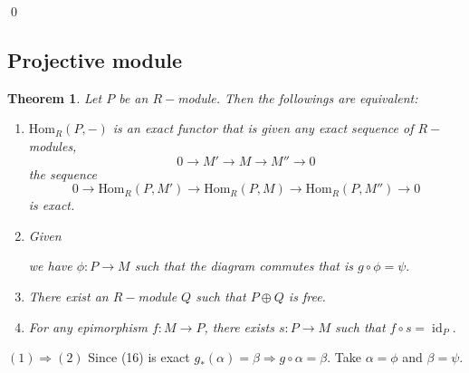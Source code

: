 \documentclass[11pt]{amsart}
\newtheorem{theorem}{Theorem}[section]
\newcommand{\Hom}[1]{\text{Hom}_R\left(#1\right)}
\DeclareMathOperator{\id}{\text{id}}
\begin{document}
\proof 

\qed

\subsection{Projective module}

\begin{theorem}

Let $P$ be an $R-$module. Then the followings are equivalent:

\begin{enumerate}

\item $\Hom{P,-}$ is an exact functor that is given any exact sequence of $R-$modules, $$0\to M'\to M\to M''\to 0$$ the sequence \begin{equation}
0\to \Hom{P,M'}\to \Hom{P,M}\to \Hom{P,M''}\to 0
\end{equation} is exact.

\item  Given \begin{center}


\end{center}
we have $\phi:P\to M$ such that the diagram commutes that is $g\circ \phi=\psi.$
 \begin{center}
 \end{center}

\item There exist an $R-$module $Q$ such that $P\oplus Q$ is free.

\item For any epimorphism $f:M\to P$, there exists $s:P\to M$ such that $f\circ s=\id_P.$  
 
\end{enumerate}

\end{theorem}

\proof $(1)\Rightarrow (2)$ Since (16) is exact $g_*(\alpha)=\beta \Rightarrow g\circ \alpha=\beta$. Take $\alpha=\phi$ and $\beta=\psi.$
\end{document}
